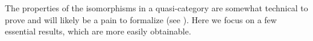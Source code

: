    The properties of the isomorphisms in a quasi-category are somewhat technical to prove and will likely be a pain to formalize (see \cite[\S D]{RiehlVerity:2022eo}). Here we focus on a few essential results, which are more easily obtainable.





